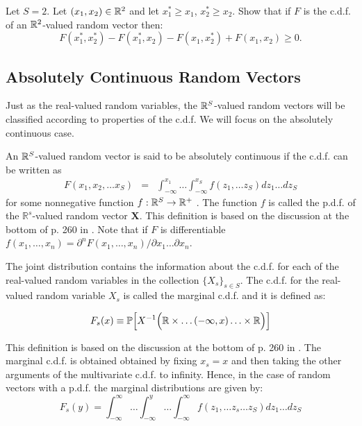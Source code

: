 \documentclass[11pt]{article} %
\begin{document}
\begin{prproblem} 
Let $S=2$. Let $(x_1,x_2) \in \mathbb{R}^{2}$ and let $x_1^* \geq x_1$, $x_2^* \geq x_2$. Show that if $F$ is the c.d.f. of an $\mathbb{R}^2$-valued random vector then: 
$$F(x_1^*, x_2^*)-F(x_1^*, x_2)-F(x_1, x_2^*)+F(x_1, x_2) \geq 0.$$
\end{prproblem}

\newpage

\subsection{Absolutely Continuous Random Vectors}

Just as the real-valued random variables, the $\mathbb{R}^S$-valued random vectors will be classified according to properties of the c.d.f. We will focus on the absolutely continuous case.

\begin{definition}  An $\mathbb{R}^{S}$-valued random vector is said to be absolutely continuous if the c.d.f. can be written as
\begin{eqnarray*}
F(x_1, x_2, \ldots x_S) &=& \int_{-\infty}^{x_1} \ldots  \int_{-\infty}^{x_S} f(z_1, \ldots z_S) dz_1 \ldots  dz_S
\end{eqnarray*}
\noindent for some nonnegative function $f:\mathbb{R}^{S} \rightarrow \mathbb{R}^{+}$ . The function $f$ is called the p.d.f. of the $\mathbb{R}^s$-valued random vector $\bm{X}$. This definition is based on the discussion at the bottom of p. 260 in \cite{Billingsley95}. Note that if $F$ is differentiable $f(x_1, \ldots, x_n) = \partial^n F(x_1, \ldots, x_n)/ \partial x_1 \ldots \partial x_n$.
\end{definition}

The joint distribution contains the information about the c.d.f. for each of the real-valued random variables in the collection $\{X_s\}_{s \in S}$. The c.d.f. for the real-valued random variable $X_s$ is called the marginal c.d.f. and it is defined as:

\begin{definition} [Marginal c.d.f.]
$$F_s(x) \equiv \mathbb{P} \Big[ X^{-1} \Big( \mathbb{R} \times \ldots (-\infty, x ) \ldots \times \mathbb{R} \Big) \Big]  $$
\end{definition}
\noindent This definition is based on the discussion at the bottom of p. 260 in \cite{Billingsley95}. The marginal c.d.f. is obtained obtained by fixing $x_s=x$ and then taking the other arguments of the multivariate c.d.f. to infinity. Hence, in the case of random vectors with a p.d.f. the marginal distributions are given by:
$$F_s(y) = \int_{-\infty}^{\infty} \ldots  \int_{-\infty}^{y} \ldots \int_{-\infty}^{\infty} f(z_1, \ldots z_s \ldots z_S) dz_1 \ldots  dz_S $$
\end{document}
